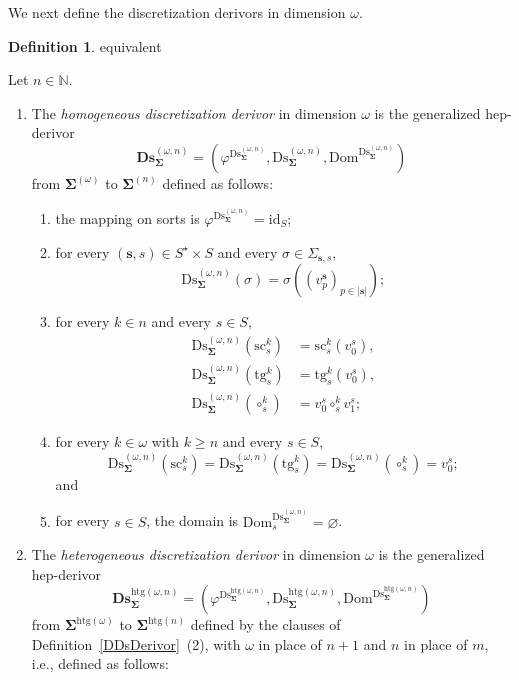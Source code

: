 \documentclass[a4paper, reqno]{amsbook}
\makeatletter
\newcommand{\bb}[1]{\ensuremath{\lvert #1 \rvert}}
\newcommand{\sig}[1]{\mathbf{#1}}             %
\newcommand{\Dom}{\mathrm{Dom}}
\newcommand{\htg}{\mathrm{htg}}                %
\newcommand{\id}{\mathrm{id}}
\newcommand{\src}{\mathrm{sc}}
\newcommand{\tgt}{\mathrm{tg}}
\newcommand{\Ds}{\mathrm{Ds}}
\newcommand{\bDs}{\mathbf{Ds}}
\theoremstyle{plain}
\theoremstyle{definition}
\newtheorem{definition}[theorem]{Definition}
\newcommand*{\CA@leanpending}{}
\newcommand*{\CA@leanrelation}{}
\newcommand*{\lean}[2]{%
  \ifcsname\string\color@lean@#1\endcsname\else
    \PackageError{main}{Unknown relation `#1' in \string\lean}{Use equivalent, weaker or stronger.}%
  \fi
  \gdef\CA@leanrelation{#1}%
  \gdef\CA@leanpending{#2}}
\makeatother
\begin{document}
We next define the discretization derivors in dimension $\omega$.

\begin{definition}\label{DDsDerivorOmega}\lean{equivalent}{Dimensions.homogeneousOmegaDiscretization,Dimensions.heterogeneousOmegaDiscretization}
Let $n\in\mathbb{N}$.
\begin{enumerate}
\item The \emph{homogeneous discretization derivor} in dimension $\omega$ is the generalized hep-derivor
$$
\bDs^{(\omega,n)}_{\sig{\Sigma}}=\left(\varphi^{\Ds^{(\omega,n)}_{\sig{\Sigma}}},\Ds^{(\omega,n)}_{\sig{\Sigma}},\Dom^{\Ds^{(\omega,n)}_{\sig{\Sigma}}}\right)
$$
from $\sig{\Sigma}^{(\omega)}$ to $\sig{\Sigma}^{(n)}$ defined as follows:
\begin{enumerate}
\item the mapping on sorts is $\varphi^{\Ds^{(\omega,n)}_{\sig{\Sigma}}}=\id_{S}$;
\item for every $(\mathbf{s},s)\in S^{\star}\times S$ and every $\sigma\in\Sigma_{\mathbf{s},s}$,
$$
\Ds^{(\omega,n)}_{\sig{\Sigma}}(\sigma)=\sigma((v^{\mathbf{s}}_{p})_{p\in\bb{\mathbf{s}}});
$$
\item for every $k\in n$ and every $s\in S$,
\begin{align*}
\Ds^{(\omega,n)}_{\sig{\Sigma}}(\src^{k}_{s})&=\src^{k}_{s}(v^{s}_{0}),\\
\Ds^{(\omega,n)}_{\sig{\Sigma}}(\tgt^{k}_{s})&=\tgt^{k}_{s}(v^{s}_{0}),\\
\Ds^{(\omega,n)}_{\sig{\Sigma}}(\circ^{k}_{s})&=v^{s}_{0}\circ^{k}_{s}v^{s}_{1};
\end{align*}
\item for every $k\in\omega$ with $k\geq n$ and every $s\in S$,
$$
\Ds^{(\omega,n)}_{\sig{\Sigma}}(\src^{k}_{s})=\Ds^{(\omega,n)}_{\sig{\Sigma}}(\tgt^{k}_{s})=\Ds^{(\omega,n)}_{\sig{\Sigma}}(\circ^{k}_{s})=v^{s}_{0};
$$
and
\item for every $s\in S$, the domain is $\Dom^{\Ds^{(\omega,n)}_{\sig{\Sigma}}}_{s}=\varnothing$.
\end{enumerate}
\item The \emph{heterogeneous discretization derivor} in dimension $\omega$ is the generalized hep-derivor
$$
\bDs^{\htg(\omega,n)}_{\sig{\Sigma}}=\left(\varphi^{\Ds^{\htg(\omega,n)}_{\sig{\Sigma}}},\Ds^{\htg(\omega,n)}_{\sig{\Sigma}},\Dom^{\Ds^{\htg(\omega,n)}_{\sig{\Sigma}}}\right)
$$
from $\sig{\Sigma}^{\htg(\omega)}$ to $\sig{\Sigma}^{\htg(n)}$ defined by the clauses of Definition~\ref{DDsDerivor}~(2), with $\omega$ in place of $n+1$ and $n$ in place of $m$, i.e., defined as follows:

\end{enumerate}
\end{definition}
\end{document}
